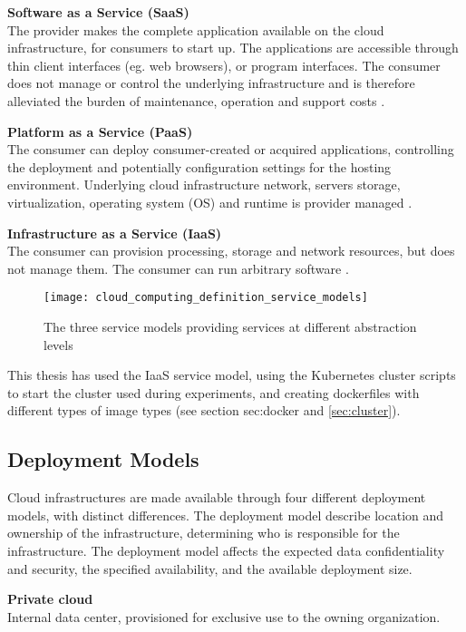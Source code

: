 \textbf{Software as a Service (SaaS)}\\
The provider makes the complete application available on the cloud infrastructure, for consumers to start up. The applications are accessible through thin client interfaces (eg. web browsers), or program interfaces. The consumer does not manage or control the underlying infrastructure and is therefore alleviated the burden of maintenance, operation and support costs \cite{youseff2008toward}.


\textbf{Platform as a Service (PaaS)}\\
The consumer can deploy consumer-created or acquired applications, controlling the deployment and potentially configuration settings for the hosting environment. Underlying cloud infrastructure network, servers storage, virtualization, operating system (OS) and runtime is provider managed \cite{youseff2008toward}.

\textbf{Infrastructure as a Service (IaaS)}\\
The consumer can provision processing, storage and network resources, but does not manage them. The consumer can run arbitrary software \cite{youseff2008toward}.

\begin{figure}[!htb]
  \texttt{[image: cloud\_computing\_definition\_service\_models]}  
  \caption{The three service models providing services at different abstraction levels}
  \label{fig:cloud_computing_definition_service_models}
\end{figure}

This thesis has used the IaaS service model, using the Kubernetes cluster scripts to start the cluster used during experiments, and creating dockerfiles with different types of image types (see section {sec:docker} and \ref{sec:cluster}).

\subsection{Deployment Models}
Cloud infrastructures are made available through four different deployment models, with distinct differences. The deployment model describe location and ownership of the infrastructure, determining who is responsible for the infrastructure. The deployment model affects the expected data confidentiality and security, the specified availability, and the available deployment size.

\textbf{Private cloud}\\
Internal data center, provisioned for exclusive use to the owning organization.

